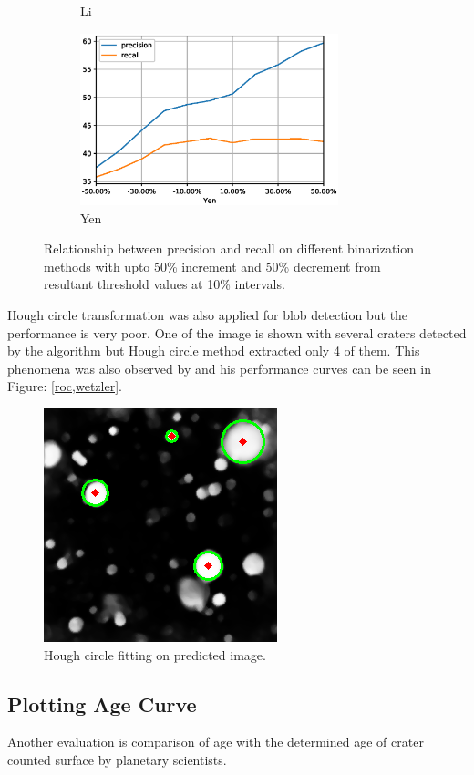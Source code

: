 \documentclass[11pt]{article}
\begin{document}
\begin{figure}[H]
\begin{subfigure}{7cm}
		\caption{Li}
	\end{subfigure}
	\begin{subfigure}[b]{1.0\textwidth}
		\centering
		\includegraphics[width=7.5cm]{files/results/yen.eps}
		\caption{Yen}
	\end{subfigure}

	\caption{Relationship between precision and recall on different binarization methods with upto 50\% increment and 50\% decrement from resultant threshold values at 10\% intervals.}
	\label{thresh_methods}
\end{figure}

Hough circle transformation was also applied for blob detection but the performance is very poor. One of the image is shown with several craters detected by the algorithm but Hough circle method extracted only 4 of them. This phenomena was also observed by \cite{wetzler2005learning} and his performance curves can be seen in Figure: \ref{roc,wetzler}.

\begin{figure}[H]
	\centering
	\includegraphics[width=.4\textwidth]{files/results/hough.png}
	\caption{Hough circle fitting on predicted image.}
	\label{hough}
\end{figure}

\subsection{Plotting Age Curve}
Another evaluation is comparison of age with the determined age of crater counted surface by planetary scientists.
\end{document}
